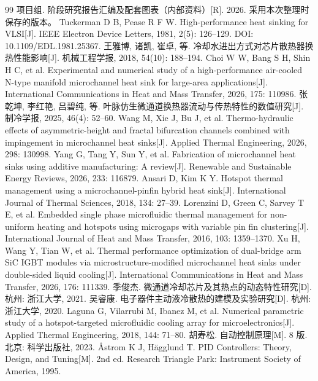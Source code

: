 \documentclass[UTF8]{midterm}
\begin{document}
\begin{thebibliography}{99}
 项目组. 阶段研究报告汇编及配套图表（内部资料）[R]. 2026. 采用本次整理时保存的版本。
 Tuckerman D B, Pease R F W. High-performance heat sinking for VLSI[J]. IEEE Electron Device Letters, 1981, 2(5): 126--129. DOI: 10.1109/EDL.1981.25367.
 王雅博, 诸凯, 崔卓, 等. 冷却水进出方式对芯片散热器换热性能影响[J]. 机械工程学报, 2018, 54(10): 188--194.
 Choi W W, Bang S H, Shin H C, et al. Experimental and numerical study of a high-performance air-cooled N-type manifold microchannel heat sink for large-area applications[J]. International Communications in Heat and Mass Transfer, 2026, 175: 110986.
 张乾坤, 李红艳, 吕碧纯, 等. 叶脉仿生微通道换热器流动与传热特性的数值研究[J]. 制冷学报, 2025, 46(4): 52--60.
 Wang M, Xie J, Bu J, et al. Thermo-hydraulic effects of asymmetric-height and fractal bifurcation channels combined with impingement in microchannel heat sinks[J]. Applied Thermal Engineering, 2026, 298: 130998.
 Yang G, Tang Y, Sun Y, et al. Fabrication of microchannel heat sinks using additive manufacturing: A review[J]. Renewable and Sustainable Energy Reviews, 2026, 233: 116879.
 Ansari D, Kim K Y. Hotspot thermal management using a microchannel-pinfin hybrid heat sink[J]. International Journal of Thermal Sciences, 2018, 134: 27--39.
 Lorenzini D, Green C, Sarvey T E, et al. Embedded single phase microfluidic thermal management for non-uniform heating and hotspots using microgaps with variable pin fin clustering[J]. International Journal of Heat and Mass Transfer, 2016, 103: 1359--1370.
 Xu H, Wang Y, Tian W, et al. Thermal performance optimization of dual-bridge arm SiC IGBT modules via microstructure-modified microchannel heat sinks under double-sided liquid cooling[J]. International Communications in Heat and Mass Transfer, 2026, 176: 111339.
 季俊杰. 微通道冷却芯片及其热点的动态特性研究[D]. 杭州: 浙江大学, 2021.
 吴睿康. 电子器件主动液冷散热的建模及实验研究[D]. 杭州: 浙江大学, 2020.
 Laguna G, Vilarrubi M, Ibanez M, et al. Numerical parametric study of a hotspot-targeted microfluidic cooling array for microelectronics[J]. Applied Thermal Engineering, 2018, 144: 71--80.
 胡寿松. 自动控制原理[M]. 8 版. 北京: 科学出版社, 2023.
 {\AA}strom K J, H{\"a}gglund T. PID Controllers: Theory, Design, and Tuning[M]. 2nd ed. Research Triangle Park: Instrument Society of America, 1995.

\end{thebibliography}
\end{document}

